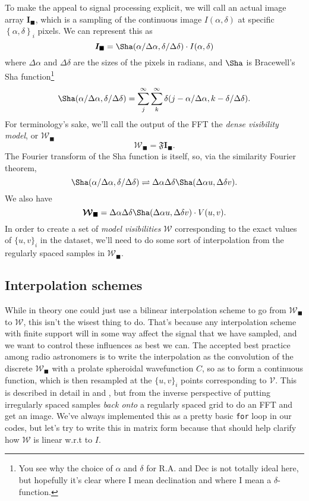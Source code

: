 \documentclass[modern]{aastex62}
\newcommand{\im}{\boldsymbol{I}_\blacksquare}
\newcommand{\vd}{\boldsymbol{\mathcal{V}}} %
\newcommand{\vm}{\boldsymbol{\mathcal{W}}} %
\begin{document}
To make the appeal to signal processing explicit, we will call an actual image array $\im$, which is a sampling of the continuous image $I(\alpha, \delta)$ at specific $\left \{\alpha, \delta \right \}_i$ pixels. We can represent this as 
\begin{equation}
    \im = \Sha(\alpha/\Delta \alpha, \delta / \Delta \delta) \cdot I(\alpha, \delta)
\end{equation}
where $\Delta \alpha$ and $\Delta \delta$ are the sizes of the pixels in radians, and $\Sha$ is Bracewell's Sha function\footnote{You see why the choice of $\alpha$ and $\delta$ for R.A. and Dec is not totally ideal here, but hopefully it's clear where I mean declination and where I mean a $\delta$-function.}
\begin{equation}
    \Sha(\alpha/\Delta \alpha, \delta / \Delta \delta)  = \sum_j^\infty \sum_k^\infty \delta(j - \alpha/\Delta \alpha, k - \delta/\Delta \delta).
\end{equation}
For terminology's sake, we'll call the output of the FFT the \emph{dense visibility model}, or $\vm_\blacksquare$
\begin{equation}
    \vm_\blacksquare = \mathfrak{F} \im.
\end{equation}
The Fourier transform of the Sha function is itself, so, via the similarity Fourier theorem,
\begin{equation}
    \Sha(\alpha/\Delta \alpha, \delta / \Delta \delta) \rightleftharpoons \Delta \alpha \Delta \delta \Sha(\Delta \alpha u, \Delta \delta v).
\end{equation}
We also have 
\begin{equation}
    \vm_\blacksquare = \Delta \alpha \Delta \delta \Sha(\Delta \alpha u, \Delta \delta v) \cdot V(u, v).
\end{equation}
In order to create a set of \emph{model visibilities} $\vm$ corresponding to the exact values of $\{ u, v\}_i$ in the dataset, we'll need to do some sort of interpolation from the regularly spaced samples in $\vm_\blacksquare$. 

\subsection{Interpolation schemes}
While in theory one could just use a bilinear interpolation scheme to go from $\vm_\blacksquare$ to $\vm$, this isn't the wisest thing to do. That's because any interpolation scheme with finite support will in some way affect the signal that we have sampled, and we want to control these influences as best we can. The accepted best practice among radio astronomers is to write the interpolation as the convolution of the discrete $\vm_\blacksquare$ with a prolate spheroidal wavefunction $C$, so as to form a continuous function, which is then resampled at the $\{ u, v\}_i$ points corresponding to $\vd$. This is described in detail in \citet[ch 7.3,][]{synthesis99} and \citet{schwab84}, but from the inverse perspective of putting irregularly spaced samples \emph{back onto} a regularly spaced grid to do an FFT and get an image. We've always implemented this as a pretty basic \texttt{for} loop in our codes, but let's try to write this in matrix form because that should help clarify how $\vm$ is linear w.r.t to $I$.
\end{document}
